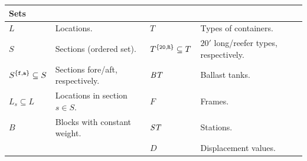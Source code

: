 \begin{centering}
\begin{tabular}{p{2.6cm}p{4.8cm}|p{2.4cm}p{4.8cm}}
\multicolumn{2}{l}{\textbf{Sets}}\\
\hline\noalign{\smallskip}
$L$  																	& Locations. 												& $T$	 																	& Types of containers.\\ 
$S$	 																	& Sections (ordered set).						& $T^{\{\texttt{20},\texttt{R}\}}\subseteq T$ & $20'$ long/reefer types, respectively. \\
$S^{\{\texttt{f}, \texttt{a}\}}\subseteq S$ & Sections fore/aft, respectively. 	& $\mathit{BT}$ 														& Ballast tanks. \\
$L_s\subseteq L$ 											& Locations in section $s\in S$. 		& $F$	 																	& Frames.\\
$B$ 																	& Blocks with constant weight. 			& $\mathit{ST}$ 														& Stations.\\
																			&																		& $D$																		& Displacement values.\\
\end{tabular}
\end{centering}
